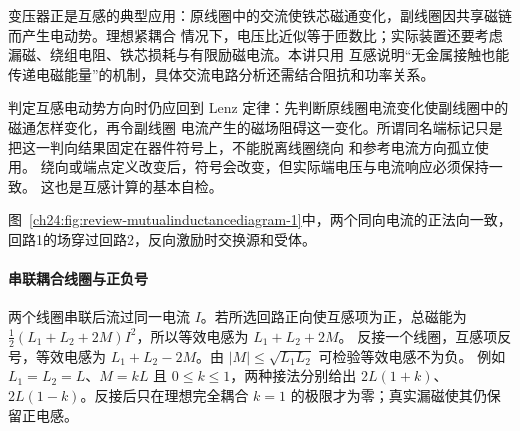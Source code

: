 变压器正是互感的典型应用：原线圈中的交流使铁芯磁通变化，副线圈因共享磁链而产生电动势。理想紧耦合
情况下，电压比近似等于匝数比；实际装置还要考虑漏磁、绕组电阻、铁芯损耗与有限励磁电流。本讲只用
互感说明“无金属接触也能传递电磁能量”的机制，具体交流电路分析还需结合阻抗和功率关系。

判定互感电动势方向时仍应回到 Lenz 定律：先判断原线圈电流变化使副线圈中的磁通怎样变化，再令副线圈
电流产生的磁场阻碍这一变化。所谓同名端标记只是把这一判向结果固定在器件符号上，不能脱离线圈绕向
和参考电流方向孤立使用。
绕向或端点定义改变后，符号会改变，但实际端电压与电流响应必须保持一致。
这也是互感计算的基本自检。

图~\ref{ch24:fig:review-mutualinductancediagram-1}中，两个同向电流的正法向一致，回路1的场穿过回路2，反向激励时交换源和受体。
\par\noindent\begin{minipage}{\linewidth}
\mutualInductanceDiagram
{}\label{ch24:fig:review-mutualinductancediagram-1}
\end{minipage}\par\medskip


\paragraph{串联耦合线圈与正负号}
两个线圈串联后流过同一电流 $I$。若所选回路正向使互感项为正，总磁能为
$\frac12(L_1+L_2+2M)I^2$，所以等效电感为 $L_1+L_2+2M$。
反接一个线圈，互感项反号，等效电感为 $L_1+L_2-2M$。由 $|M|\le\sqrt{L_1L_2}$ 可检验等效电感不为负。
例如 $L_1=L_2=L$、$M=kL$ 且 $0\le k\le1$，两种接法分别给出 $2L(1+k)$、$2L(1-k)$。反接后只在理想完全耦合 $k=1$ 的极限才为零；真实漏磁使其仍保留正电感。



